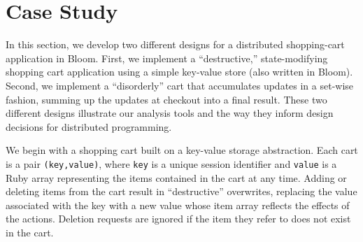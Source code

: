 \section{Case Study}
\label{sec:case}

In this section, we develop two different designs for a distributed shopping-cart
application in Bloom.  First, we implement a ``destructive,'' state-modifying
shopping cart application using a simple key-value store (also written in Bloom).
Second, we implement a ``disorderly'' cart that accumulates updates in a 
set-wise fashion, summing up the updates at checkout into a final result.  These two different designs illustrate our analysis tools and the way they inform design decisions for distributed programming.

We begin with a shopping cart built on a key-value storage abstraction.  Each
cart is a pair \texttt{(key,value)}, where \texttt{key} is a unique session
identifier and \texttt{value} is 
a Ruby array representing the items contained in the cart
at any time. Adding or deleting items from the cart result in ``destructive''
overwrites, replacing the value associated with the key with a new value whose
item array reflects the effects of the actions.  Deletion requests are ignored
if the item they refer to does not exist in the cart.

